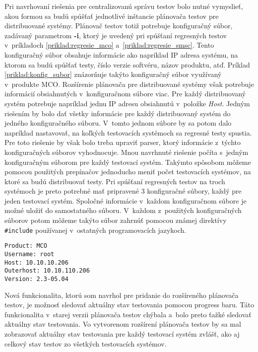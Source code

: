 Pri navrhovaní riešenia pre centralizovanú správu testov bolo nutné 
vymyslieť, akou formou sa budú spúšťať jednotlivé inštancie plánovača testov pre 
distribuované systémy. Plánovač testov totiž potrebuje konfiguračný súbor,
zadávaný parametrom \textbf{-i}, ktorý je uvedený pri spúšťaní regresných testov
v~príkladoch \ref{priklad:regresie_mco} a~\ref{priklad:regresie_smsc}.
Tento konfiguračný súbor obsahuje informácie ako napríklad IP adresa systému, na ktorom sa 
budú spúšťať testy, číslo verzie softvéru, názov 
produktu, atď. Príklad \ref{priklad:konfig_subor} znázorňuje takýto 
konfiguračný súbor využívaný v~produkte MCO. 
Rozšírenie plánovača pre distribuované systémy však potrebuje informácií 
obsiahnutých v~konfiguračnom súbore viac.
Pre každý distribuovaný systém potrebuje napríklad jednu IP adresu 
obsiahnutú v~položke \textit{Host}.
Jedným riešením by bolo dať všetky informácie pre každý distribuovaný 
systém do jedného konfiguračného súboru.
V~tomto jednom súbore by sa potom dalo napríklad nastavovať, na koľkých 
testovacích systémoch sa regresné testy spustia.
Pre toto riešenie by však bolo treba upraviť parser, ktorý informácie 
z~týchto konfiguračných súborov vyhodnocuje.
Mnou navrhnuté riešenie počíta s~jedným konfiguračným súborom pre 
každý testovací systém. Takýmto spôsobom môžeme pomocou použitých prepínačov
jednoducho meniť počet testovacích systémov, na ktoré sa budú distribuovať testy.
Pri spúšťaní regresných testov na troch systémoch je preto potrebné 
mať pripravené 3 konfiguračné súbory, každý pre jeden testovací systém. 
Spoločné informácie v~každom konfiguračnom súbore je možné uložiť do 
samostatného súboru. V~každom z~použitých konfiguračných súborov potom môžeme 
takýto súbor zahrnúť pomocou známej direktívy \texttt{\#include} 
používanej v~ostatných programovacích jazykoch.

\begin{lstlisting}[caption=Konfiguračný súbor pre produkt MCO,label=priklad:konfig_subor]
Product: MCO
Username: root
Host: 10.10.10.206
Outerhost: 10.10.110.206
Version: 2.3-05.04
\end{lstlisting}

Nová funkcionalita, ktorú som navrhol pre pridanie do rozšíreného 
plánovača testov, je možnosť sledovať aktuálny stav testovania pomocou 
progress baru. 
Táto funkcionalita v~starej verzii plánovača testov chýbala a~bolo 
preto ťažké sledovať aktuálny stav testovania. 
Vo vytvorenom rozšírení plánovača testov by sa mal zobrazovať aktuálny stav 
testovania pre každý testovací systém zvlášť, ako aj celkový stav testov
zo všetkých testovacích systémov.

